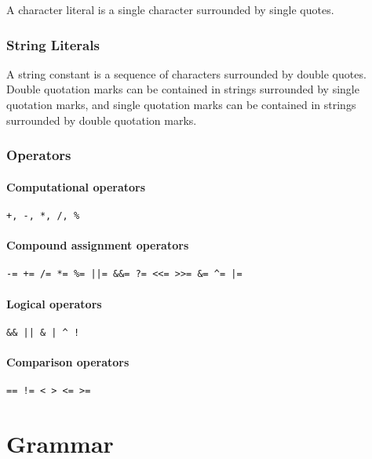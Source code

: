 \documentclass[10pt]{report}
\begin{document}
A character literal is a single character surrounded by single quotes.

\subsection{String Literals}
\label{sec:str_lit}

A string constant is a sequence of characters surrounded by double quotes. Double quotation marks can be contained in strings surrounded by single quotation marks, and single quotation marks can be contained in strings surrounded by double quotation marks.


\subsection{Operators}
\label{sec:operators}

\subsubsection{Computational operators}
\begin{verbatim}
+, -, *, /, %
\end{verbatim}


\subsubsection{Compound assignment operators}
\begin{verbatim}
-= += /= *= %= ||= &&= ?= <<= >>= &= ^= |=
\end{verbatim}

\subsubsection{Logical operators}
\begin{verbatim}
&& || & | ^ !
\end{verbatim}

\subsubsection{Comparison operators}
\begin{verbatim}
== != < > <= >=
\end{verbatim}

\chapter{Grammar}
\label{chap:grammar}
\end{document}
